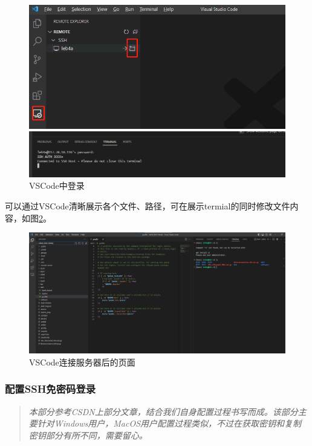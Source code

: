 \begin{figure}[ht]
    \centering
    \begin{minipage}[c]{0.9\textwidth}
        \centering
        \includegraphics[width=13cm]{image/env/ssh-login.png}
    \end{minipage}

    \begin{minipage}[c]{0.9\textwidth}
        \centering
        \includegraphics[width=13cm]{image/env/pswd.png}
    \end{minipage}
    \caption{VSCode中登录}
    \label{login}
\end{figure}

可以通过VSCode清晰展示各个文件、路径，可在展示termial的同时修改文件内容，如图\ref{vsc-page}。
\begin{figure}[ht]
    \centering
    \includegraphics[width=13.5cm]{image/env/vs-remote-show.png}
    \caption{VSCode连接服务器后的页面}
    \label{vsc-page}
\end{figure}

\subsubsection{配置SSH免密码登录}
\begin{quotation}
    \textit{本部分参考CSDN上部分文章\cite{ssh-nopswd}，结合我们自身配置过程书写而成。该部分主要针对Windows用户，MacOS用户配置过程类似，不过在获取密钥和复制密钥部分有所不同，需要留心。}
\end{quotation}

